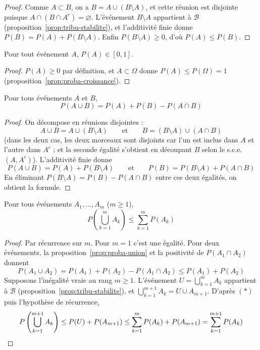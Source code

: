 \begin{proof}
Comme $A\subset B$, on a $B=A\cup(B\setminus A)$, et cette réunion est disjointe puisque $A\cap(B\cap A^c)=\varnothing$. L'événement $B\setminus A$ appartient à $\mathcal{B}$ (proposition~\ref{prop:tribu-stabilite}), et l'additivité finie donne $P(B)=P(A)+P(B\setminus A)$. Enfin $P(B\setminus A)\geq 0$, d'où $P(A)\leq P(B)$.
\end{proof}

\begin{coro}
\label{coro:proba-01}
Pour tout événement $A$, $P(A)\in[0,1]$.
\end{coro}

\begin{proof}
$P(A)\geq 0$ par définition, et $A\subset\Omega$ donne $P(A)\leq P(\Omega)=1$ (proposition~\ref{prop:proba-croissance}).
\end{proof}

\begin{prop}
\label{prop:proba-union}
Pour tous événements $A$ et $B$,
\[P(A\cup B)=P(A)+P(B)-P(A\cap B)\]
\end{prop}

\begin{proof}
On décompose en réunions disjointes :
\[A\cup B=A\cup(B\setminus A)\qquad\text{et}\qquad B=(B\setminus A)\cup(A\cap B)\]
(dans les deux cas, les deux morceaux sont disjoints car l'un est inclus dans $A$ et l'autre dans $A^c$ ; et la seconde égalité s'obtient en découpant $B$ selon le s.c.e.\ $(A,A^c)$). L'additivité finie donne
\[P(A\cup B)=P(A)+P(B\setminus A)\qquad\text{et}\qquad P(B)=P(B\setminus A)+P(A\cap B)\]
En éliminant $P(B\setminus A)=P(B)-P(A\cap B)$ entre ces deux égalités, on obtient la formule.
\end{proof}

\begin{prop}
\label{prop:sous-additivite}
Pour tous événements $A_1,\dots,A_m$ ($m\geq 1$),
\[P\left(\bigcup_{k=1}^{m}A_k\right)\leq\sum_{k=1}^{m}P(A_k)\]
\end{prop}

\begin{proof}
Par récurrence sur $m$. Pour $m=1$ c'est une égalité. Pour deux événements, la proposition~\ref{prop:proba-union} et la positivité de $P(A_1\cap A_2)$ donnent
\[P(A_1\cup A_2)=P(A_1)+P(A_2)-P(A_1\cap A_2)\leq P(A_1)+P(A_2) \tag{$\ast$}\]
Supposons l'inégalité vraie au rang $m\geq 1$. L'événement $U=\bigcup_{k=1}^mA_k$ appartient à $\mathcal{B}$ (proposition~\ref{prop:tribu-stabilite}), et $\bigcup_{k=1}^{m+1}A_k=U\cup A_{m+1}$. D'après $(\ast)$ puis l'hypothèse de récurrence,
\[P\left(\bigcup_{k=1}^{m+1}A_k\right)\leq P(U)+P(A_{m+1})\leq\sum_{k=1}^{m}P(A_k)+P(A_{m+1})=\sum_{k=1}^{m+1}P(A_k)\qedhere\]
\end{proof}

